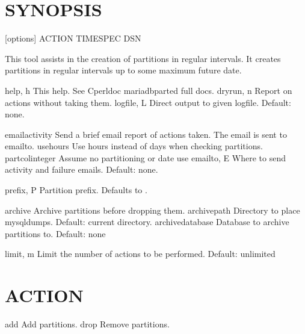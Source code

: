\documentclass[letterpaper,10pt,english]{sphinxmanual}
\begin{document}
\section{SYNOPSIS}
\label{\detokenize{mariadb-parted:synopsis}}
\sphinxAtStartPar
{} {[}options{]} ACTION TIMESPEC DSN

\sphinxAtStartPar
This tool assists in the creation of partitions in regular intervals.
It creates partitions in regular intervals up to some maximum future date.

\begin{sphinxVerbatim}[commandchars=\\\{\}]
\PYGZhy{}\PYGZhy{}help,          \PYGZhy{}h   This help. See C\PYGZlt{}perldoc mariadb\PYGZhy{}parted\PYGZgt{}  full docs.
\PYGZhy{}\PYGZhy{}dryrun,        \PYGZhy{}n   Report on actions without taking them.
\PYGZhy{}\PYGZhy{}logfile,       \PYGZhy{}L   Direct output to given logfile. Default: none.

\PYGZhy{}\PYGZhy{}email\PYGZhy{}activity      Send a brief email report of actions taken.
                      The email is sent to \PYGZhy{}\PYGZhy{}email\PYGZhy{}to.
\PYGZhy{}\PYGZhy{}use\PYGZhy{}hours          Use hours instead of days when checking partitions.
\PYGZhy{}\PYGZhy{}partcol\PYGZhy{}integer     Assume no partitioning  or date   use
\PYGZhy{}\PYGZhy{}email\PYGZhy{}to,      \PYGZhy{}E   Where to send activity and failure emails.
                      Default: none.

\PYGZhy{}\PYGZhy{}prefix,        \PYGZhy{}P   Partition prefix. Defaults to .

\PYGZhy{}\PYGZhy{}archive             Archive partitions before dropping them.
\PYGZhy{}\PYGZhy{}archive\PYGZhy{}path        Directory to place mysqldumps.
                      Default: current directory.
\PYGZhy{}\PYGZhy{}archive\PYGZhy{}database    Database to archive partitions to.
                      Default: none

\PYGZhy{}\PYGZhy{}limit,         \PYGZhy{}m   Limit the number of actions to be performed.
                      Default:  unlimited
\end{sphinxVerbatim}


\section{ACTION}
\label{\detokenize{mariadb-parted:action}}
\begin{sphinxVerbatim}[commandchars=\\\{\}]
\PYGZhy{}\PYGZhy{}add   Add partitions.
\PYGZhy{}\PYGZhy{}drop  Remove partitions.
\end{sphinxVerbatim}
\end{document}
